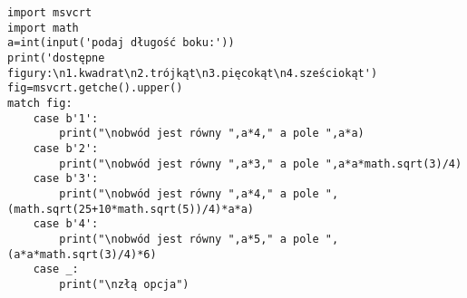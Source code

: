 \begin{verbatim}
import msvcrt
import math
a=int(input('podaj długość boku:'))
print('dostępne figury:\n1.kwadrat\n2.trójkąt\n3.pięcokąt\n4.sześciokąt')
fig=msvcrt.getche().upper()
match fig:
    case b'1': 
        print("\nobwód jest równy ",a*4," a pole ",a*a)
    case b'2':
        print("\nobwód jest równy ",a*3," a pole ",a*a*math.sqrt(3)/4)
    case b'3':
        print("\nobwód jest równy ",a*4," a pole ",(math.sqrt(25+10*math.sqrt(5))/4)*a*a)
    case b'4':
        print("\nobwód jest równy ",a*5," a pole ",(a*a*math.sqrt(3)/4)*6)
    case _:
        print("\nzłą opcja")
\end{verbatim}